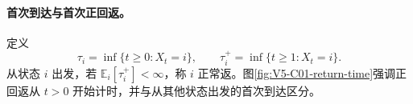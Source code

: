 \documentclass[UTF8,a4paper,11pt,openany]{ctexbook}
\begin{document}
\setcounter{page}{702}
\setcounter{chapter}{30}
\setcounter{figure}{2}
\pagestyle{headings}
\paragraph{首次到达与首次正回返。}定义
\[
  \tau_i=\inf\{t\ge0:X_t=i\},\qquad
  \tau_i^+=\inf\{t\ge1:X_t=i\}.
\]
从状态 $i$ 出发，若 $\mathbb E_i[\tau_i^+]<\infty$，称 $i$ 正常返。图\ref{fig:V5-C01-return-time}强调正回返从 $t>0$ 开始计时，并与从其他状态出发的首次到达区分。

\end{document}
